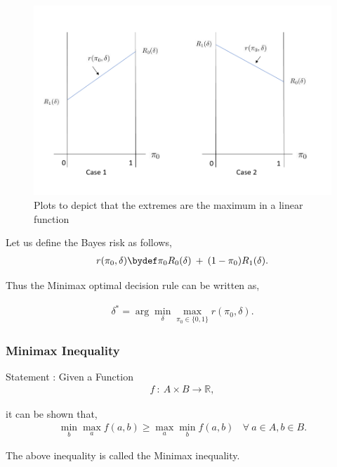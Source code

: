\documentclass[12pt]{report}
\begin{document}
	\begin{figure}[htbp]
		\begin{center}
			\includegraphics[scale = 0.39]{Figures/BayesLine.png}
			\caption{Plots to depict that the extremes are the maximum in a linear function}
			\label{fig:BayesLine}
		\end{center}
	\end{figure}

	
	
	\noindent Let us define the Bayes risk as follows,
	\begin{align}
	r(\pi_0,\delta) \bydef \pi_0 R_0(\delta) \: + \: (1-\pi_0) R_1(\delta).
	\end{align}
	
	\noindent Thus the Minimax optimal decision rule can be written as,

	\begin{align}
	\delta^* =	\arg \min_{\delta} \max_{\pi_0 \in \{0,1\}} r(\pi_0,\delta).
	\end{align}

	
	\subsubsection{Minimax Inequality}
	Statement : Given a Function
	\begin{align*}
		f \: : \: A \times B \to \mathbb{R},
	\end{align*}
	
	\noindent it can be shown that,
	\begin{align*}
		\min_{b} \max_{a} f(a,b) \geq \max_{a} \min_{b} f(a,b) \: \: \: \: \forall \: a \in A, b \in B.
	\end{align*}

	\noindent The above inequality is called the Minimax inequality.
\end{document}
